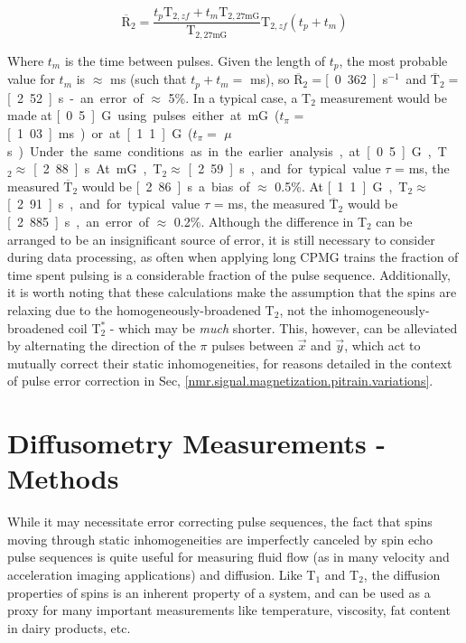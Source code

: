 \documentclass[PaulGanssle-Thesis.tex]{subfiles}
\begin{document}
\begin{equation}
\label{eqn:AvgRelaxationRate}
\overline{\mathrm{R}}_{2} = \frac{t_{p}\mathrm{T}_{2,zf} + t_{m}\mathrm{T}_{2,27\mathrm{mG}}}{\mathrm{T}_{2,27\mathrm{mG}}}\mathrm{T}_{2,zf}\left(t_{p} + t_{m}\right)
\end{equation}

 Where $t_{m}$ is the time between pulses. Given the length of $t_{p}$, the most probable value for $t_{m}$ is $\approx$ \unit[73]{ms} (such that $t_{p} + t_{m} =$ \unit[100]{ms}), so $\overline{\mathrm{R}}_{2} = $\unit[0.362]{s$^{-1}$} and $\overline{\mathrm{T}}_{2} = $ \unit[2.52]{s} - an error of $\approx$ 5\%. In a typical case, a T$_2$ measurement would be made at \unit[0.5]{G} using pulses either at \unit[114]{mG} ($t_{\pi}$ = \unit[1.03]{ms}) or at \unit[1.1]{G} ($t_{\pi} =$ \unit[107]{$\mu$s}). Under the same conditions as in the earlier analysis, at \unit[0.5]{G}, T$_2 \approx$ \unit[2.88]{s}. At \unit[114]{mG}, T$_2 \approx$ \unit[2.59]{s}, and for typical value $\tau $ = \unit[20]{ms}, the measured $\overline{\mathrm{T}}_{2}$ would be \unit[2.86]{s} a bias of $\approx$ 0.5\%. At \unit[1.1]{G}, T$_2 \approx$ \unit[2.91]{s}, and for typical value $\tau $ = \unit[5]{ms}, the measured $\overline{\mathrm{T}}_{2}$ would be \unit[2.885]{s}, an error of $\approx$ 0.2\%. Although the difference in T$_2$ can be arranged to be an insignificant source of error, it is still necessary to consider during data processing, as often when applying long CPMG trains the fraction of time spent pulsing is a considerable fraction of the pulse sequence.  Additionally, it is worth noting that these calculations make the assumption that the spins are relaxing due to the homogeneously-broadened T$_2$, not the inhomogeneously-broadened coil T$_2^*$ - which may be \textit{much} shorter. This, however, can be alleviated by alternating the direction of the $\pi$ pulses between $\vec{x}$ and $\vec{y}$, which act to mutually correct their static inhomogeneities, for reasons detailed in the context of pulse error correction in Sec, \ref{nmr.signal.magnetization.pitrain.variations}.
  
\section{Diffusometry Measurements - Methods}
\label{Section:Relaxometry-Diffusion}
While it may necessitate error correcting pulse sequences, the fact that spins moving through static inhomogeneities are imperfectly canceled by spin echo pulse sequences is quite useful for measuring fluid flow (as in many velocity and acceleration imaging applications) and diffusion. Like T$_1$ and T$_2$, the diffusion properties of spins is an inherent property of a system, and can be used as a proxy for many important measurements like temperature, viscosity, fat content in dairy products, etc.\cite{kopf-biophys-1996,guthausen-jaocs-2004}
\end{document}
